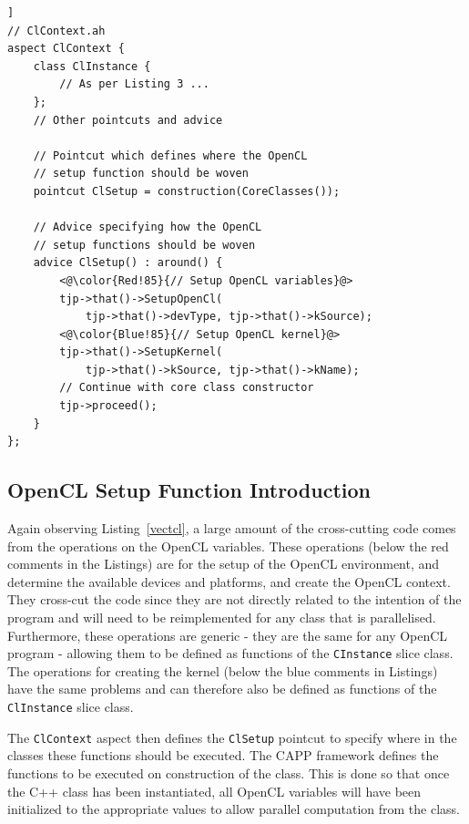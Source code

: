 \documentclass{sig-alternate-05-2015}
\begin{document}
\begin{lstlisting}[caption=Abstract aspect with the pointcut and advice for
OpenCL setup.,label=clsetup,float=[!t]]
// ClContext.ah
aspect ClContext {
	class ClInstance {
		// As per Listing 3 ...
	};
	// Other pointcuts and advice

	// Pointcut which defines where the OpenCL
	// setup function should be woven
	pointcut ClSetup = construction(CoreClasses());
  
	// Advice specifying how the OpenCL
	// setup functions should be woven
	advice ClSetup() : around() {
		<@\color{Red!85}{// Setup OpenCL variables}@>
		tjp->that()->SetupOpenCl(
			tjp->that()->devType, tjp->that()->kSource);
		<@\color{Blue!85}{// Setup OpenCL kernel}@>
		tjp->that()->SetupKernel(
			tjp->that()->kSource, tjp->that()->kName); 
		// Continue with core class constructor
		tjp->proceed();
	}
};
\end{lstlisting}

\subsection{OpenCL Setup Function Introduction}

Again observing Listing~\ref{vectcl}, a large amount of the cross-cutting code
comes from the operations on the OpenCL variables. These operations (below the
red comments in the Listings) are for the setup of the OpenCL environment, and 
determine the available devices and platforms, and create the OpenCL context. They
cross-cut the \CPP code since they are not directly related to the intention of the
program and will need to be reimplemented for any class that is parallelised. Furthermore, 
these operations are generic - they are the same for any 
OpenCL program - allowing them to be defined as functions of the \lstinline$CInstance$
slice class. The operations for creating the kernel (below the blue 
comments in Listings) have the same problems and can therefore also be defined
as functions of the \lstinline$ClInstance$ slice class. 

The \lstinline$ClContext$ aspect then defines the \lstinline$ClSetup$ pointcut to
specify where in the \CPP classes these functions should be executed. The
 CAPP framework defines the functions to be executed on construction of the
\CPP class. This is done so that once the C++ class has been instantiated,
all OpenCL variables will have been initialized to the appropriate values to allow
parallel computation from the \CPP class. 
\end{document}
